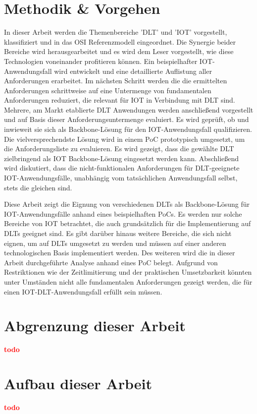 \section{Methodik \& Vorgehen}
\label{sec:intro:methodology}
In dieser Arbeit werden die Themenbereiche '\ac{DLT}' und '\ac{IOT}' vorgestellt, klassifiziert und in das \ac{OSI} Referenzmodell eingeordnet. Die Synergie beider Bereiche wird herausgearbeitet und es wird dem Leser vorgestellt, wie diese Technologien voneinander profitieren können. Ein beispielhafter \ac{IOT}-Anwendungsfall wird entwickelt und eine detaillierte Auflistung aller Anforderungen erarbeitet. Im nächsten Schritt werden die die ermittelten Anforderungen schrittweise auf eine Untermenge von fundamentalen Anforderungen reduziert, die relevant für \ac{IOT} in Verbindung mit \ac{DLT} sind. Mehrere, am Markt etablierte \ac{DLT} Anwendungen werden anschließend vorgestellt und auf Basis dieser Anforderungsuntermenge evaluiert. Es wird geprüft, ob und inwieweit sie sich als Backbone-Lösung für den \ac{IOT}-Anwendungsfall qualifizieren. Die vielversprechendste Lösung wird in einem \ac{PoC} prototypisch umgesetzt, um die Anforderungsliste zu evaluieren. Es wird gezeigt, dass die gewählte \ac{DLT} zielbringend als \ac{IOT} Backbone-Lösung eingesetzt werden kann. Abschließend wird diskutiert, dass die nicht-funktionalen Anforderungen für \ac{DLT}-geeignete \ac{IOT}-Anwendungsfälle, unabhängig vom tatsächlichen Anwendungsfall selbst, stets die gleichen sind.

Diese Arbeit zeigt die Eignung von verschiedenen \ac{DLT}s als Backbone-Lösung für \ac{IOT}-Anwendungsfälle anhand eines beispielhaften \ac{PoC}s. Es werden nur solche Bereiche von \ac{IOT} betrachtet, die auch grundsätzlich für die Implementierung auf \ac{DLT}s geeignet sind. Es gibt darüber hinaus weitere Bereiche, die sich nicht eignen, um auf \ac{DLT}s umgesetzt zu werden und müssen auf einer anderen technologischen Basis implementiert werden. Des weiteren wird die in dieser Arbeit durchgeführte Analyse anhand eines \ac{PoC} belegt. Aufgrund von Restriktionen wie der Zeitlimitierung und der praktischen Umsetzbarkeit könnten unter Umständen nicht alle fundamentalen Anforderungen gezeigt werden, die für einen \ac{IOT}-\ac{DLT}-Anwendungsfall erfüllt sein müssen.


%
%
\section{Abgrenzung dieser Arbeit}
\label{sec:relatedwork:differentiation}
\textbf{\textcolor{red}{todo}}


%
%
\section{Aufbau dieser Arbeit}
\label{sec:intro:structure}
\textbf{\textcolor{red}{todo}}
